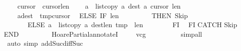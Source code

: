 \begin{isabellebody}
\ \ \ \ {\isasymacute}cursor{}\ {\isacharcolon}{\isacharequal}{\isacharequal}\ {\isasymacute}cursor{}{\isacharminus}{\isasymacute}len{}{\isacharsemicolon}{\isacharsemicolon}\isanewline
\ \ \ \ {\isasymacute}a\ {\isacharcolon}{\isacharequal}{\isacharequal}\ list{\isacharunderscore}copy\ {\isasymacute}a\ {\isacharparenleft}{\isasymacute}dest{\isacharplus}{}{\isacharparenright}\ {\isasymacute}a\ {\isacharparenleft}{\isasymacute}cursor{}{\isacharplus}{}{\isacharparenright}\ {\isasymacute}len{}{\isacharsemicolon}{\isacharsemicolon}\isanewline
\ \ \ \ {\isasymacute}a{\isacharbang}{\isasymacute}dest\ {\isacharcolon}{\isacharequal}{\isacharequal}\ {\isasymacute}tmp{\isacharbang}{\isasymacute}cursor{}\isanewline
\ \ ELSE\ IF\ {\isasymacute}len{}\ {\isacharequal}\ {}\isanewline
\ \ \ \ \ \ \ THEN\ Skip\isanewline
\ \ \ \ \ \ \ ELSE\ {\isasymacute}a\ {\isacharcolon}{\isacharequal}{\isacharequal}\ list{\isacharunderscore}copy\ {\isasymacute}a\ {\isacharparenleft}{\isasymacute}dest{\isacharminus}{\isacharparenleft}{\isasymacute}len{}{\isacharminus}{}{\isacharparenright}{\isacharparenright}\ {\isasymacute}tmp\ {}\ {\isasymacute}len{}\ \isanewline
\ \ \ \ \ \ \ FI\isanewline
\ \ FI\isanewline
CATCH\isanewline
Skip\isanewline
END{\isachardoublequoteclose}\isanewline
\ \ \ \ \ \ \ \ \ HoarePartial{\isachardot}annotateI{\isacharparenright}\isanewline
\ \ \ \isamarkupfalse%
\ vcg\isanewline
\ \ \ \ \ \ \ \ \isamarkupfalse%
\ {\isacharparenleft}simp{\isacharunderscore}all{\isacharparenright}\isanewline
\ \ \ \ \isamarkupfalse%
\ {\isacharparenleft}auto\ simp\ add{\isacharcolon}Suc{\isacharunderscore}diff{\isacharunderscore}Suc{\isacharparenright}\isanewline
\ \ \isamarkupfalse%
%
\endisatagproof
{\isafoldproof}%
%
\isadelimproof
\ \isanewline
%
\endisadelimproof
\isanewline
%
\isadelimtheory
\isanewline
%
\endisadelimtheory
%
\isatagtheory
{}\isamarkupfalse%
%
\endisatagtheory
{\isafoldtheory}%
%
\isadelimtheory
%
\endisadelimtheory
%
\end{isabellebody}%
